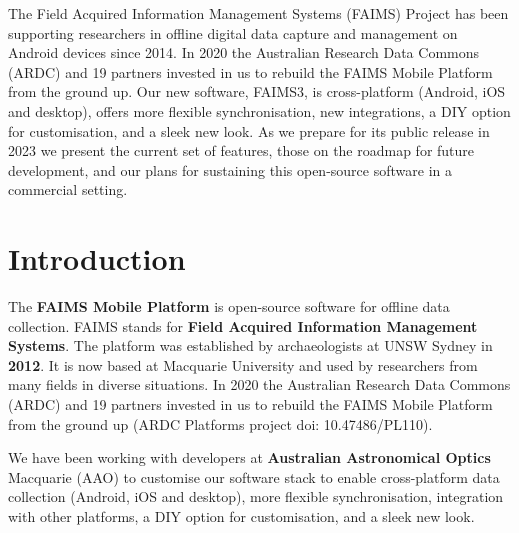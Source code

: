 \documentclass[a0,portrait]{a0poster}
\begin{document}
\begin{multicols}{3} %

\begingroup
{
\color{faimsblue} %


The Field Acquired Information Management Systems (FAIMS) Project has been supporting researchers in offline digital data capture and management on Android devices since 2014. In 2020 the Australian Research Data Commons (ARDC) and 19 partners invested in us to rebuild the FAIMS Mobile Platform from the ground up. Our new software, FAIMS3, is cross-platform (Android, iOS and desktop), offers more flexible synchronisation, new integrations, a DIY option for customisation, and a sleek new look. As we prepare for its public release in 2023 we present the current set of features, those on the roadmap for future development, and our plans for sustaining this open-source software in a commercial setting.}
\endgroup
\color{Black} %



\section*{Introduction}

The \textbf{FAIMS Mobile Platform} is open-source software for offline data collection. FAIMS stands for \textbf{Field Acquired Information Management Systems}. The platform was established by archaeologists at UNSW Sydney in \textbf{2012}. It is now based at Macquarie University and used by researchers from many fields in diverse situations. In 2020 the Australian Research Data Commons (ARDC) and 19 partners invested in us to rebuild the FAIMS Mobile Platform from the ground up (ARDC Platforms project doi: 10.47486/PL110). 

We have been working with developers at \textbf{Australian Astronomical Optics} Macquarie (AAO) to customise our software stack to enable cross-platform data collection (Android, iOS and desktop), more flexible synchronisation, integration with other platforms, a DIY option for customisation, and a sleek new look.


\end{multicols}
\end{document}
